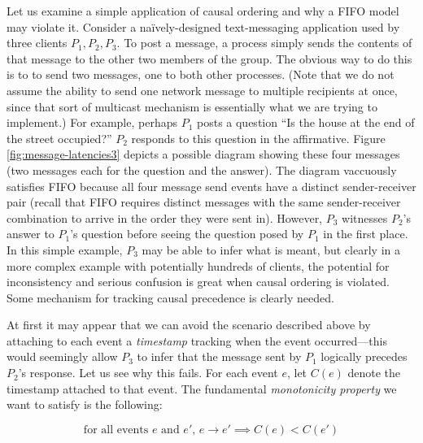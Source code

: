 \documentclass[]             %
{NASA}                       %
\theoremstyle{definition}
\begin{document}
Let us examine a simple application of causal ordering and why a FIFO
model may violate it. Consider a na\"ively-designed text-messaging
application used by three clients $P_1, P_2, P_3$. To post a message,
a process simply sends the contents of that message to the other two
members of the group. The obvious way to do this is to to send two
messages, one to both other processes. (Note that we do not assume the
ability to send one network message to multiple recipients at once,
since that sort of multicast mechanism is essentially what we are
trying to implement.) For example, perhaps $P_1$ posts a question ``Is
the house at the end of the street occupied?'' $P_2$ responds to this
question in the affirmative. Figure \ref{fig:message-latencies3}
depicts a possible diagram showing these four messages (two messages
each for the question and the answer). The diagram vaccuously
satisfies FIFO because all four message send events have a distinct
sender-receiver pair (recall that FIFO requires distinct messages with
the same sender-receiver combination to arrive in the order they were
sent in). However, $P_3$ witnesses $P_2$'s answer to $P_1$'s question
before seeing the question posed by $P_1$ in the first place. In this
simple example, $P_3$ may be able to infer what is meant, but clearly
in a more complex example with potentially hundreds of clients, the
potential for inconsistency and serious confusion is great when causal
ordering is violated. Some mechanism for tracking causal precedence is
clearly needed.

At first it may appear that we can avoid the scenario described above
by attaching to each event a \emph{timestamp} tracking when the event
occurred---this would seemingly allow $P_3$ to infer that the message
sent by $P_1$ logically precedes $P_2$'s response. Let us see why this
fails. For each event $e$, let $C(e)$ denote the timestamp attached to
that event. The fundamental \emph{monotonicity property} we want to
satisfy is the following:

\[ \textrm{for all events $e$ and $e'$, } e \to e' \implies C(e) < C(e') \label{eq:mp}\tag{MP} \]
\end{document}
